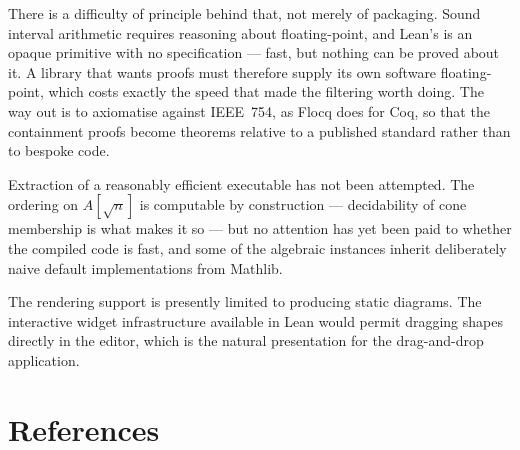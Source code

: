 There is a difficulty of principle behind that, not merely of packaging. Sound
interval arithmetic requires reasoning about floating-point, and Lean's
 is an opaque primitive with no specification --- fast, but nothing
can be proved about it. A library that wants proofs must therefore supply its own
software floating-point, which costs exactly the speed that made the filtering
worth doing. The way out is to axiomatise  against IEEE~754, as
Flocq does for Coq, so that the containment proofs become theorems relative to a
published standard rather than to bespoke code.

Extraction of a reasonably efficient executable has not been attempted. The
ordering on $A[\sqrt{n}]$ is computable by construction --- decidability of cone
membership is what makes it so --- but no attention has yet been paid to whether
the compiled code is fast, and some of the algebraic instances inherit
deliberately naive default implementations from Mathlib.

The rendering support is presently limited to producing static diagrams. The
interactive widget infrastructure available in Lean would permit dragging shapes
directly in the editor, which is the natural presentation for the drag-and-drop
application.

\chapter{References}

